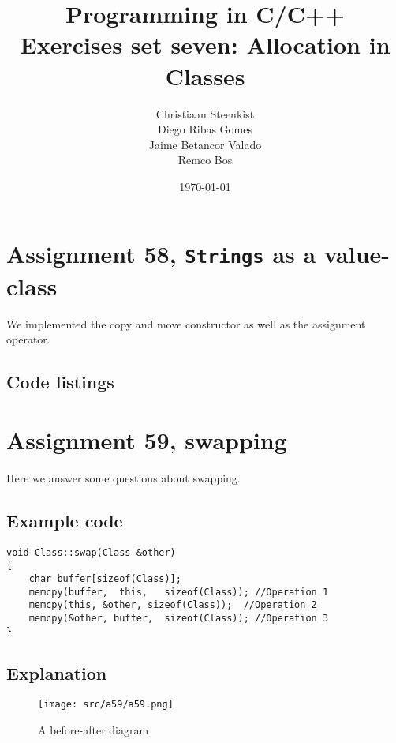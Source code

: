 \documentclass[11pt]{article}
\begin{document}
\title{Programming in C/C++ \\
       Exercises set seven: Allocation in Classes
}
\date{\today}
\author{Christiaan Steenkist \\
Diego Ribas Gomes \\
Jaime Betancor Valado \\
Remco Bos \\
}

\maketitle

\section*{Assignment 58, \texttt{Strings} as a value-class}
We implemented the copy and move constructor as well as the assignment operator.

\subsection*{Code listings}






\section*{Assignment 59, swapping}
Here we answer some questions about swapping.

\subsection*{Example code}
\begin{lstlisting}
void Class::swap(Class &other)
{
	char buffer[sizeof(Class)];
	memcpy(buffer,  this,   sizeof(Class)); //Operation 1
	memcpy(this, &other, sizeof(Class));  //Operation 2
	memcpy(&other, buffer,  sizeof(Class)); //Operation 3	
}
\end{lstlisting}

\subsection*{Explanation}
\begin{figure}[!ht]
\caption{A before-after diagram}
\centering
\texttt{[image: src/a59/a59.png]}
\end{figure}
\end{document}
